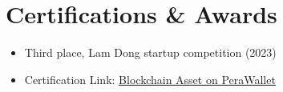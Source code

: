 \documentclass[11pt]{article}
\begin{document}
\section{Certifications \& Awards}
\begin{itemize}
    \item[\checkmark] Third place, Lam Dong startup competition (2023)
    \item[\checkmark] Certification Link: \href{https://explorer.perawallet.app/asset/2255455434/}{Blockchain Asset on PeraWallet}
\end{itemize}
\end{document}
